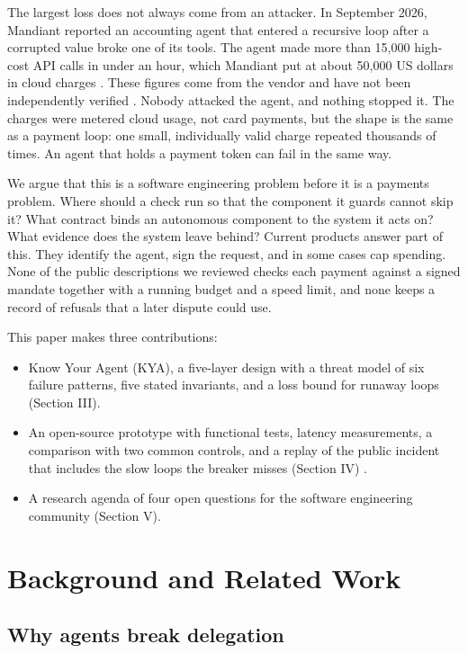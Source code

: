 \documentclass[conference]{IEEEtran}
\begin{document}
The largest loss does not always come from an attacker. In September 2026, Mandiant reported an accounting agent that entered a recursive loop after a corrupted value broke one of its tools. The agent made more than 15,000 high-cost API calls in under an hour, which Mandiant put at about 50,000 US dollars in cloud charges \cite{b6,b7}. These figures come from the vendor and have not been independently verified \cite{b8}. Nobody attacked the agent, and nothing stopped it. The charges were metered cloud usage, not card payments, but the shape is the same as a payment loop: one small, individually valid charge repeated thousands of times. An agent that holds a payment token can fail in the same way.

We argue that this is a software engineering problem before it is a payments problem. Where should a check run so that the component it guards cannot skip it? What contract binds an autonomous component to the system it acts on? What evidence does the system leave behind? Current products answer part of this. They identify the agent, sign the request, and in some cases cap spending. None of the public descriptions we reviewed checks each payment against a signed mandate together with a running budget and a speed limit, and none keeps a record of refusals that a later dispute could use.

This paper makes three contributions:

\begin{itemize}
\item
  Know Your Agent (KYA), a five-layer design with a threat model of six failure patterns, five stated invariants, and a loss bound for runaway loops (Section III).
\item
  An open-source prototype with functional tests, latency measurements, a comparison with two common controls, and a replay of the public incident that includes the slow loops the breaker misses (Section IV) \cite{b31}.
\item
  A research agenda of four open questions for the software engineering community (Section V).
\end{itemize}

\section{Background and Related Work}

\subsection{Why agents break delegation}
\end{document}
